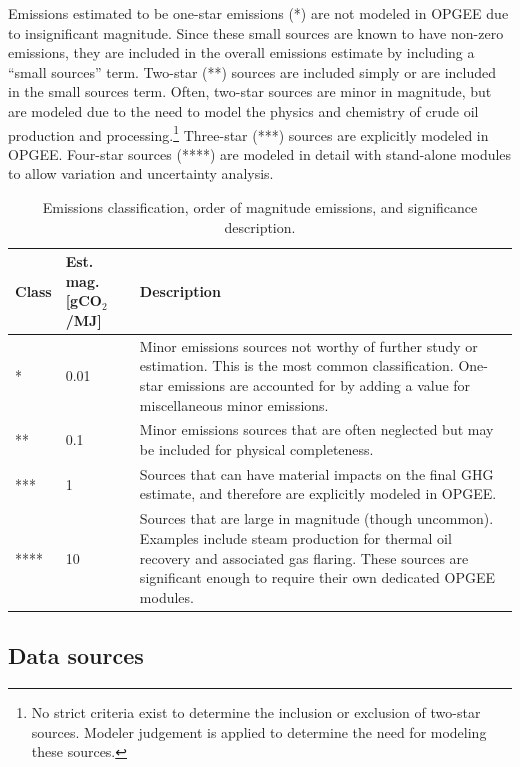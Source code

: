 \documentclass[11pt]{report}
\newcommand{\marg}[1]{{\footnotesize\textit{\textcolor{stanford}{'#1'}}}}
\newcommand{\marginnote}[1]{\marginpar{\marg{#1}}}
\begin{document}
Emissions estimated to be one-star emissions (*) are not modeled in OPGEE due to insignificant magnitude. Since these small sources are known to have non-zero emissions, they are included in the overall emissions estimate by including a ``small sources'' term. \marginnote{Results 2.8} Two-star (**) sources are included simply or are included in the small sources term. Often, two-star sources are minor in magnitude, but are modeled due to the need to model the physics and chemistry of crude oil production and processing.\footnote{No strict criteria exist to determine the inclusion or exclusion of two-star sources. Modeler judgement is applied to determine the need for modeling these sources.} Three-star (***) sources are explicitly modeled in OPGEE. Four-star sources (****) are modeled in detail with stand-alone modules to allow variation and uncertainty analysis. 

\begin{table}
\begin{scriptsize}
\caption{Emissions classification, order of magnitude emissions, and significance description.}
\label{tab:emissions_significance}
\begin{tabular}{p{}p{}p{}}
\toprule
Class & Est. mag. [gCO$_2$/MJ] & Description \\
\midrule
* & 0.01 & Minor emissions sources not worthy of further study or estimation. This is the most common classification. One-star emissions are accounted for by adding a value for miscellaneous minor emissions.\\
** & 0.1 & Minor emissions sources that are often neglected but may be included for physical completeness.\\
*** & 1 & Sources that can have material impacts on the final GHG estimate, and therefore are explicitly modeled in OPGEE. \\
**** & 10 & Sources that are large in magnitude (though uncommon). Examples include steam production for thermal oil recovery and associated gas flaring. These sources are significant enough to require their own dedicated OPGEE modules.\\
\bottomrule 
\end{tabular}
\end{scriptsize}
\end{table}


\subsection{Data sources}
\end{document}
